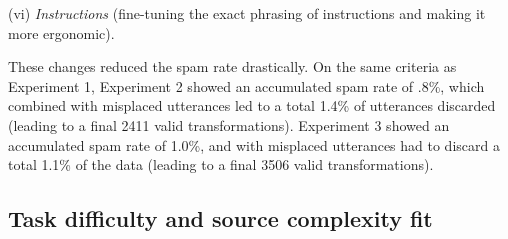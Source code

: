 (vi)  \emph{Instructions} (fine-tuning the exact phrasing of instructions and making it more ergonomic).

These changes reduced the spam rate drastically. On the same criteria as
Experiment 1, Experiment 2 showed an accumulated spam rate of .8\%,
which combined with misplaced utterances led to a total 1.4\% of
utterances discarded (leading to a final 2411 valid transformations).
Experiment 3 showed an accumulated spam rate of 1.0\%, and with
misplaced utterances had to discard a total 1.1\% of the data (leading
to a final 3506 valid transformations).

%
\subsection{Task difficulty and source complexity
fit}\label{task-difficulty-and-source-complexity-fit}


